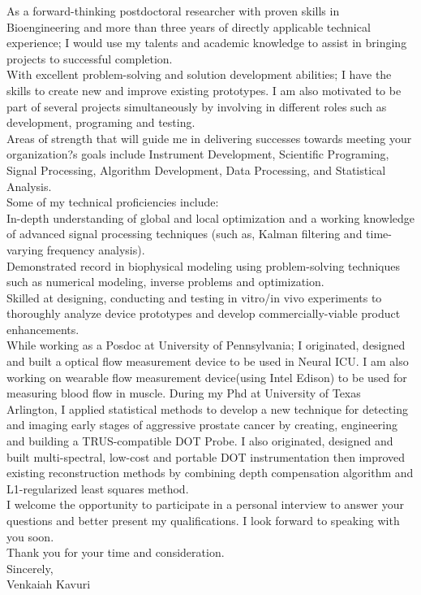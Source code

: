 \documentclass{my_cv}
\begin{document}
As a forward-thinking postdoctoral researcher with proven skills in Bioengineering and more than three years of directly applicable technical experience; I would use my talents and academic knowledge to assist in bringing projects to successful completion. \\
With excellent problem-solving and solution development abilities; I have the skills to create new and improve existing prototypes. I am also motivated to be part of several projects simultaneously by involving in different roles such as development, programing and testing.\\
Areas of strength that will guide me in delivering successes towards meeting your organization?s goals include Instrument Development, Scientific Programing, Signal Processing, Algorithm Development, Data Processing, and Statistical Analysis.\\
\vspace{2mm} 
Some of my technical proficiencies include:\\
\vspace{2mm} 
In-depth understanding of global and local optimization and a working knowledge of advanced signal processing techniques (such as, Kalman filtering and time-varying frequency analysis).\\
\vspace{2mm} 
Demonstrated record in biophysical modeling using problem-solving techniques such as numerical modeling, inverse problems and optimization.\\
\vspace{2mm} 
Skilled at designing, conducting and testing in vitro/in vivo experiments to thoroughly analyze device prototypes and develop commercially-viable product enhancements.\\
\vspace{2mm} 
While working as a Posdoc at University of Pennsylvania; I originated, designed and built a optical flow measurement device to be used in Neural ICU. I am also working on wearable flow measurement device(using Intel Edison) to be used for measuring blood flow in muscle. 
During my Phd at University of Texas Arlington, I applied statistical methods to develop a new technique for detecting and imaging early stages of aggressive prostate cancer by creating, engineering and building a TRUS-compatible DOT Probe. I also originated, designed and built multi-spectral, low-cost and portable DOT instrumentation then improved existing reconstruction methods by combining depth compensation algorithm and L1-regularized least squares method.\\
\vspace{2mm} 
I welcome the opportunity to participate in a personal interview to answer your questions and better present my qualifications. I look forward to speaking with you soon.\\
\vspace{2mm} 
Thank you for your time and consideration.\\
\vspace{10mm} 
Sincerely,\\

\vspace{5mm} 
Venkaiah Kavuri\\
\end{document}
